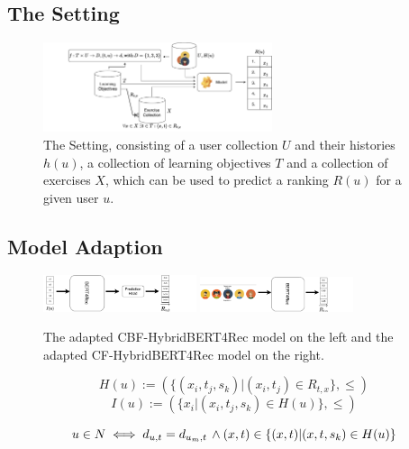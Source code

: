 \documentclass{Academic}
\begin{document}
        \subsection{The Setting}
        \begin{figure}[ht!]
            \centering
            \includegraphics[width=0.6\textwidth]{images/setting.pdf}
            \caption{The Setting, consisting of a user collection $U$ and their histories $h(u)$, a collection of learning objectives $T$ and a collection of exercises $X$, which can be used to predict a ranking $R(u)$ for a given user $u$.}
            \label{fig:setting}
        \end{figure}
        
        \FloatBarrier
        \subsection{Model Adaption}
        \begin{figure}[ht!]
            \centering
            \includegraphics[width=0.4\textwidth]{images/cbf.pdf}
            \includegraphics[width=0.4\textwidth]{images/CF_use_case.pdf}
            \caption{The adapted CBF-HybridBERT4Rec model on the left and the adapted CF-HybridBERT4Rec model on the right.}
            \label{fig:modelAdapt}
        \end{figure}

        \begin{equation}
            H(u) := (\{(x_i, t_j, s_k)| (x_i, t_j) \in R_{t,x}\}, \leq)
        \end{equation}
        \begin{equation}
            I(u) := (\{x_i|(x_i, t_j, s_k) \in H(u)\}, \leq)
        \end{equation}

        \begin{equation}
            u \in N \iff d_{u, t} = d_{u_m, t} \text{\,} \wedge (x, t) \in \{(x,t)|(x,t,s_k) \in H(u)\}
        \end{equation}
\end{document}
